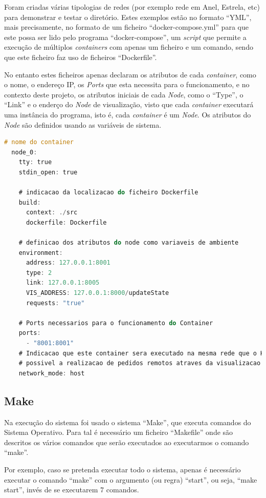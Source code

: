 Foram criadas várias tipologias de redes (por exemplo rede em Anel, Estrela, etc) para demonstrar e testar o diretório.
Estes exemplos estão no formato ``YML'', mais precisamente, no formato de um ficheiro ``docker-compose.yml'' para que este possa ser lido pelo programa ``docker-compose'', um \emph{script} que permite a execução de múltiplos \emph{containers} com apenas um ficheiro e um comando, sendo que este ficheiro faz uso de ficheiros ``Dockerfile''.

No entanto estes ficheiros apenas declaram os atributos de cada \emph{container}, como o nome, o endereço \acs{IP}, os \emph{Ports} que esta necessita para o funcionamento, e no contexto deste projeto, os atributos iniciais de cada \emph{Node}, como o ``Type'', o 
``Link'' e o enderço do \emph{Node} de visualização, visto que cada \emph{container} executará uma instância do programa, isto é, cada \emph{container} é um \emph{Node}. Os atributos do \emph{Node} são definidos usando as variáveis de sistema.


\begin{lstlisting}[caption={Ficheiro docker-compose.yml},language=C]
  # nome do container
  node_0:
    tty: true
    stdin_open: true

    # indicacao da localizacao do ficheiro Dockerfile
    build:
      context: ./src
      dockerfile: Dockerfile

    # definicao dos atributos do node como variaveis de ambiente
    environment:
      address: 127.0.0.1:8001
      type: 2 
      link: 127.0.0.1:8005
      VIS_ADDRESS: 127.0.0.1:8000/updateState
      requests: "true"

    # Ports necessarios para o funcionamento do Container
    ports:
      - "8001:8001"
    # Indicacao que este container sera executado na mesma rede que o Host, isto para que seja
    # possivel a realizacao de pedidos remotos atraves da visualizacao
    network_mode: host
\end{lstlisting}


\subsection*{Make}

Na execução do sistema foi usado o sistema ``Make'', que executa comandos do Sistema Operativo. Para tal é necessário um ficheiro ``Makefile'' onde são descritos os vários comandos que serão executados ao executarmos o comando ``make''.

Por exemplo, caso se pretenda executar todo o sistema, apenas é necessário executar o comando ``make'' com o argumento (ou regra) ``start'', ou seja, ``make start'', invés de se executarem 7 comandos.



